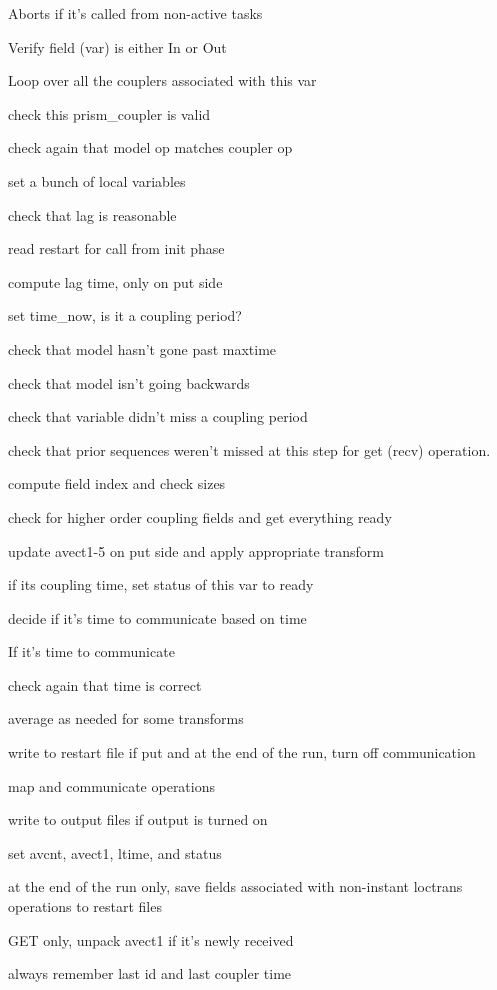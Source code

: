 \begin{DoxyItemize}
\item Aborts if it's called from non-\/active tasks
\item Verify field (var) is either In or Out
\item Loop over all the couplers associated with this var
\begin{DoxyItemize}
\item check this prism\+\_\+coupler is valid
\item check again that model op matches coupler op
\item set a bunch of local variables
\item check that lag is reasonable
\item read restart for call from init phase
\item compute lag time, only on put side
\item set time\+\_\+now, is it a coupling period?
\item check that model hasn't gone past maxtime
\item check that model isn't going backwards
\item check that variable didn't miss a coupling period
\item check that prior sequences weren't missed at this step for get (recv) operation.
\item compute field index and check sizes
\item check for higher order coupling fields and get everything ready
\item update avect1-\/5 on put side and apply appropriate transform
\item if its coupling time, set status of this var to ready
\item decide if it's time to communicate based on time
\item If it's time to communicate
\begin{DoxyItemize}
\item check again that time is correct
\item average as needed for some transforms
\item write to restart file if put and at the end of the run, turn off communication
\item map and communicate operations
\item write to output files if output is turned on
\item set avcnt, avect1, ltime, and status
\end{DoxyItemize}
\item at the end of the run only, save fields associated with non-\/instant loctrans operations to restart files
\item G\+E\+T only, unpack avect1 if it's newly received
\item always remember last id and last coupler time 
\end{DoxyItemize}
\end{DoxyItemize}

